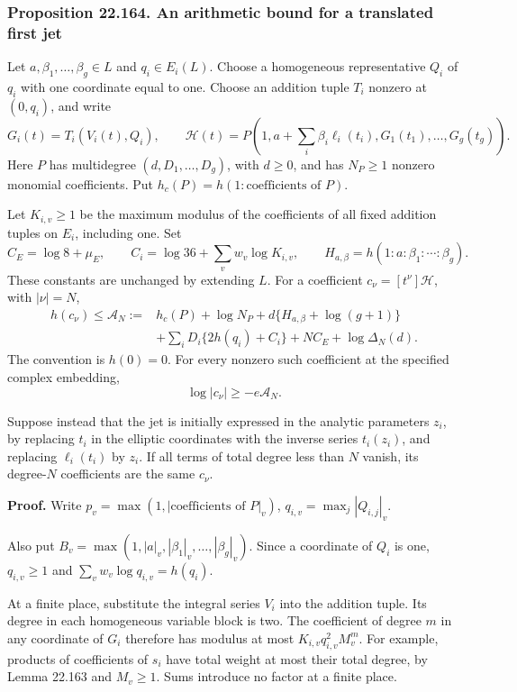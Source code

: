 \documentclass[
  11pt,
  a4paper,
]{article}
\begin{document}
\subsubsection{Proposition 22.164. An arithmetic bound for a translated
first
jet}\label{proposition-22.164.-an-arithmetic-bound-for-a-translated-first-jet}

Let \(a,\beta_1,\ldots,\beta_g\in L\) and \(q_i\in E_i(L)\). Choose a
homogeneous representative \(Q_i\) of \(q_i\) with one coordinate equal
to one. Choose an addition tuple \(T_i\) nonzero at \((0,q_i)\), and
write \[
 G_i(t)=T_i(V_i(t),Q_i),\qquad
 \mathscr H(t)=P\left(1,a+\sum_i\beta_i\ell_i(t_i),
                             G_1(t_1),\ldots,G_g(t_g)\right).
 \tag{22.453}
\] Here \(P\) has multidegree \((d,D_1,\ldots,D_g)\), with \(d\ge0\),
and has \(N_P\ge1\) nonzero monomial coefficients. Put
\(h_c(P)=h(1:\text{coefficients of }P)\).

Let \(K_{i,v}\ge1\) be the maximum modulus of the coefficients of all
fixed addition tuples on \(E_i\), including one. Set \[
 C_E=\log8+\mu_E,\qquad
 C_i=\log36+\sum_vw_v\log K_{i,v},\qquad
 H_{a,\beta}=h(1:a:\beta_1:\cdots:\beta_g).
 \tag{22.454}
\] These constants are unchanged by extending \(L\). For a coefficient
\(c_\nu=[t^\nu]\mathscr H\), with \(|\nu|=N\), \[
\begin{split}
 h(c_\nu)\le\mathcal A_N:={}&h_c(P)+\log N_P
       +d\{H_{a,\beta}+\log(g+1)\}\\
 &+\sum_iD_i\{2h(q_i)+C_i\}
       +NC_E+\log\Delta_N(d).
\end{split}
\tag{22.455}
\] The convention is \(h(0)=0\). For every nonzero such coefficient at
the specified complex embedding, \[
 \log|c_\nu|\ge-e\mathcal A_N.
 \tag{22.456}
\]

Suppose instead that the jet is initially expressed in the analytic
parameters \(z_i\), by replacing \(t_i\) in the elliptic coordinates
with the inverse series \(t_i(z_i)\), and replacing \(\ell_i(t_i)\) by
\(z_i\). If all terms of total degree less than \(N\) vanish, its
degree-\(N\) coefficients are the same \(c_\nu\).

\textbf{Proof.} Write \(p_v=\max(1,|\text{coefficients of }P|_v)\),
\(q_{i,v}=\max_j|Q_{i,j}|_v\).

Also put \(B_v=\max(1,|a|_v,|\beta_1|_v,\ldots,|\beta_g|_v)\). Since a
coordinate of \(Q_i\) is one, \(q_{i,v}\ge1\) and
\(\sum_vw_v\log q_{i,v}=h(q_i)\).

At a finite place, substitute the integral series \(V_i\) into the
addition tuple. Its degree in each homogeneous variable block is two.
The coefficient of degree \(m\) in any coordinate of \(G_i\) therefore
has modulus at most \(K_{i,v}q_{i,v}^2M_v^m\). For example, products of
coefficients of \(s_i\) have total weight at most their total degree, by
Lemma 22.163 and \(M_v\ge1\). Sums introduce no factor at a finite
place.
\end{document}
